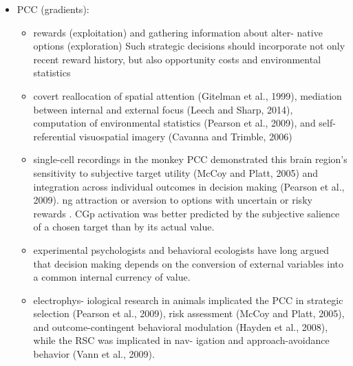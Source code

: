 \documentclass{article} %
\begin{document}
\begin{itemize}
\begin{itemize}
\end{itemize}

  \item
    PCC (gradients):
    \begin{itemize}
      \item rewards (exploitation) and gathering information about alter- native options (exploration)
Such strategic decisions should incorporate not only recent reward history, but also opportunity costs and environmental statistics

\item
covert reallocation of spatial attention (Gitelman et al., 1999), mediation between internal and external focus (Leech and Sharp, 2014), computation of environmental statistics (Pearson et al., 2009), and self-referential visuospatial imagery (Cavanna and Trimble, 2006)


\item
single-cell recordings in the monkey PCC demonstrated this brain region's sensitivity to subjective target utility (McCoy and Platt, 2005) and integration across individual outcomes in decision making (Pearson et al., 2009).
ng attraction or aversion to options with uncertain or risky rewards
. CGp activation was better predicted by the
subjective salience of a chosen target than by its actual value.

\item
experimental psychologists and behavioral ecologists
have long argued that decision making depends on the conversion
of external variables into a common internal currency of value.

\item
electrophys- iological research in animals implicated the PCC in strategic selection (Pearson et al., 2009), risk assessment (McCoy and Platt, 2005), and outcome-contingent behavioral modulation (Hayden et al., 2008), while the RSC was implicated in nav- igation and approach-avoidance behavior (Vann et al., 2009).


\end{itemize}
\end{itemize}
\end{document}
